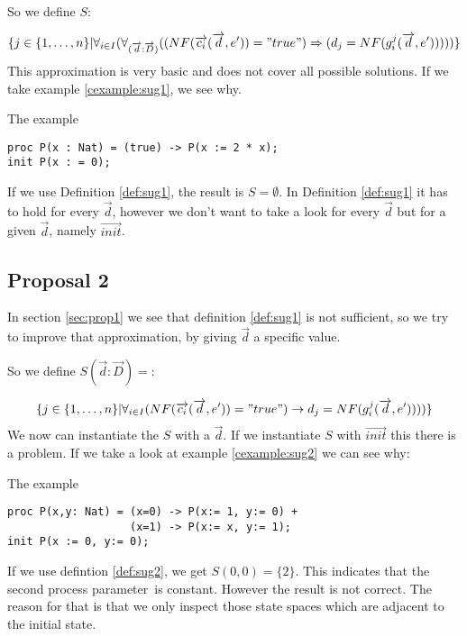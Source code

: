 \documentclass[a4paper,10pt]{article}
\newcommand{\lpe}{linear process equation}
\newcommand{\ovr}{\overrightarrow}
\newcommand{\pp}{process parameter}
\begin{document}
So we define $S$:
\begin{defn} \label{def:sug1}
\begin{displaymath}
\lbrace   
j \in \lbrace 1, \ldots , n \rbrace \vert \forall_{i\in I} (\forall_{(\ovr{d}: \ovr{D})}((NF(\ovr{c_i}(\ovr{d},e')) = "true")  \Rightarrow (d_j = NF(g_i^j(\ovr{d},e')))))\rbrace
\end{displaymath}
This approximation is very basic and does not cover all possible solutions. If we take example
\ref{cexample:sug1}, we see why.
\begin{example} \label{cexample:sug1} The example \\
\begin{verbatim}
proc P(x : Nat) = (true) -> P(x := 2 * x);
init P(x : = 0);
\end{verbatim}

\end{example}
If we use Definition \ref{def:sug1}, the result is $S = \emptyset$. 
In Definition \ref{def:sug1} it has to hold for every $\ovr{d}$, however
we don't want to take a look for every $\ovr{d}$ but for a given $\ovr{d}$, namely $\ovr{init}$.
\end{defn}

\subsection{Proposal 2}
In section \ref{sec:prop1} we see that definition \ref{def:sug1} is not sufficient, so we try to improve that approximation, by giving $\ovr{d}$ a specific value.  

So we define $S(\ovr{d}:\ovr{D})=$:
\begin{defn} \label{def:sug2}
\begin{displaymath}
\lbrace   
j \in \lbrace 1, \ldots , n \rbrace \vert \forall_{i\in I} (NF(\ovr{c_i}(\ovr{d},e')) = "true") \rightarrow d_j = NF(g_i^j(\ovr{d},e'))))\rbrace
\end{displaymath}
We now can instantiate the $S$ with a $\ovr{d}$. If we instantiate $S$ with $\ovr{init}$ this there is a problem. If we take a look at example \ref{cexample:sug2} we can see why:
\begin{example} \label{cexample:sug2} The example \\
\begin{verbatim} 
proc P(x,y: Nat) = (x=0) -> P(x:= 1, y:= 0) +
                   (x=1) -> P(x:= x, y:= 1);
init P(x := 0, y:= 0);
\end{verbatim}

\end{example}
If we use defintion \ref{def:sug2}, we get $S(0,0) = \lbrace 2 \rbrace$. This indicates that the second \pp\ is constant. However the result is not correct. The reason for that is that we only inspect those state spaces which are adjacent to the initial state.
\end{defn}
\end{document}
